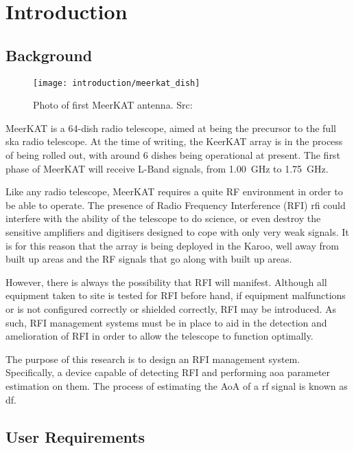 \chapter{Introduction}
\section{Background}
\begin{wrapfigure}{r}{0.4\textwidth}
  \begin{center}
    \texttt{[image: introduction/meerkat\_dish]}
  \end{center}
  \caption{Photo of first MeerKAT antenna. Src: \cite{skasawebsite}}
\end{wrapfigure}
MeerKAT is a 64-dish radio telescope, aimed at being the precursor to the full \gls{ska} radio telescope. At the time of writing, the KeerKAT array is in the process of being rolled out, with around 6 dishes being operational at present.
The first phase of MeerKAT will receive L-Band signals, from \SI{1.00}{\giga\hertz} to \SI{1.75}{\giga\hertz}. 

Like any radio telescope, MeerKAT requires a quite RF environment in order to be able to operate. 
The presence of Radio Frequency Interference (RFI) \gls{rfi} could interfere with the ability of the telescope to do science, or even destroy the sensitive amplifiers and digitisers designed to cope with only very weak signals.
It is for this reason that the array is being deployed in the Karoo, well away from built up areas and the RF signals that go along with built up areas. 

However, there is always the possibility that RFI will manifest. 
Although all equipment taken to site is tested for RFI before hand, if equipment malfunctions or is not configured correctly or shielded correctly, RFI may be introduced.
As such, RFI management systems must be in place to aid in the detection and amelioration of RFI in order to allow the telescope to function optimally.

The purpose of this research is to design an RFI management system. 
Specifically, a device capable of detecting RFI and performing \gls{aoa} parameter estimation on them. 
The process of estimating the AoA of a \gls{rf} signal is known as \gls{df}.

\section{User Requirements}

